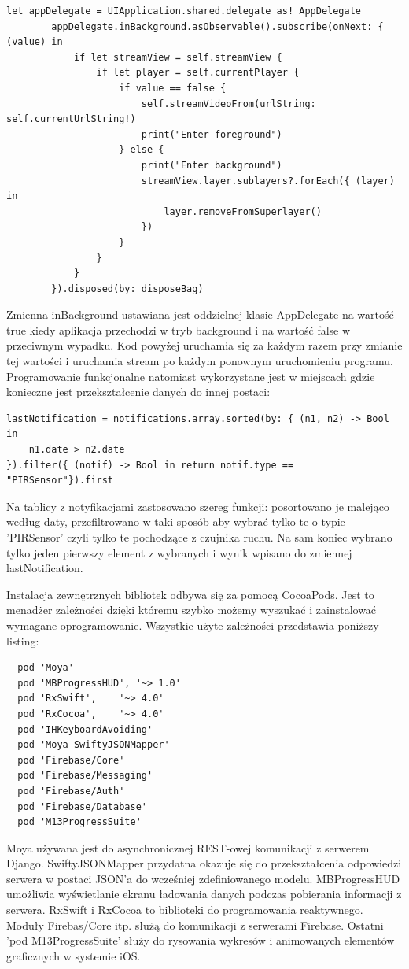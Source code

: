 \begin{verbatim}
let appDelegate = UIApplication.shared.delegate as! AppDelegate
        appDelegate.inBackground.asObservable().subscribe(onNext: { (value) in
            if let streamView = self.streamView {
                if let player = self.currentPlayer {
                    if value == false {
                        self.streamVideoFrom(urlString: self.currentUrlString!)
                        print("Enter foreground")
                    } else {
                        print("Enter background")
                        streamView.layer.sublayers?.forEach({ (layer) in
                            layer.removeFromSuperlayer()
                        })
                    }
                }
            }
        }).disposed(by: disposeBag)
\end{verbatim}
Zmienna inBackground ustawiana jest oddzielnej klasie AppDelegate na wartość true kiedy aplikacja przechodzi w tryb background i na wartość false w przeciwnym wypadku. Kod powyżej uruchamia się za każdym razem przy zmianie tej wartości i uruchamia stream po każdym ponownym uruchomieniu programu.
Programowanie funkcjonalne natomiast wykorzystane jest w miejscach gdzie konieczne jest przekształcenie danych do innej postaci:
\begin{verbatim}
lastNotification = notifications.array.sorted(by: { (n1, n2) -> Bool in
	n1.date > n2.date 
}).filter({ (notif) -> Bool in return notif.type == "PIRSensor"}).first
\end{verbatim}
Na tablicy z notyfikacjami zastosowano szereg funkcji: posortowano je malejąco według daty, przefiltrowano w taki sposób aby wybrać tylko te o typie 'PIRSensor' czyli tylko te pochodzące z czujnika ruchu. Na sam koniec wybrano tylko jeden pierwszy element z wybranych i wynik wpisano do zmiennej lastNotification.


Instalacja zewnętrznych bibliotek odbywa się za pomocą CocoaPods. Jest to menadżer zależności dzięki któremu szybko możemy wyszukać i zainstalować wymagane oprogramowanie. Wszystkie użyte zależności przedstawia poniższy listing: 

\begin{verbatim}
  pod 'Moya'
  pod 'MBProgressHUD', '~> 1.0'
  pod 'RxSwift',    '~> 4.0'
  pod 'RxCocoa',    '~> 4.0'
  pod 'IHKeyboardAvoiding'
  pod 'Moya-SwiftyJSONMapper'
  pod 'Firebase/Core'
  pod 'Firebase/Messaging'
  pod 'Firebase/Auth'
  pod 'Firebase/Database'
  pod 'M13ProgressSuite'
\end{verbatim}
Moya używana jest do asynchronicznej REST-owej komunikacji z serwerem Django. SwiftyJSONMapper przydatna okazuje się do przekształcenia odpowiedzi serwera w postaci JSON'a do wcześniej zdefiniowanego modelu. MBProgressHUD umożliwia wyświetlanie ekranu ładowania danych podczas pobierania informacji z serwera. RxSwift i RxCocoa to biblioteki do programowania reaktywnego. Moduły Firebas/Core itp. służą do komunikacji z serwerami Firebase. Ostatni 'pod M13ProgressSuite' służy do rysowania wykresów i animowanych elementów graficznych w systemie iOS.

